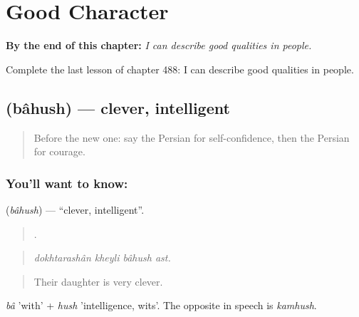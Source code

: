 
\chapter{Good Character}
\label{ch:fa-good-character}

\begin{chapteropening}
\textbf{By the end of this chapter:} \emph{I can describe good qualities in people.}

Complete the last lesson of chapter 488: I can describe good qualities in people.
\end{chapteropening}

\section[\texorpdfstring{\fa{باهوش} (bâhush)}{باهوش (bâhush)}]{ (bâhush) — clever, intelligent}

\label{lesson:FA-C488-bahush}



\begin{quote}
Before the new one: say the Persian for self-confidence, then the Persian for courage.
\end{quote}

\subsection*{You'll want to know: }
\textbf{} (\emph{bâhush}) — \textquotedblleft{}clever, intelligent\textquotedblright{}.

\begin{quote}
   .
\end{quote}

\begin{quote}
\emph{dokhtarashân kheyli bâhush ast.}
\end{quote}

\begin{quote}
Their daughter is very clever.
\end{quote}

\emph{bâ} 'with' + \emph{hush} 'intelligence, wits'. The opposite in speech is \emph{kamhush}.

